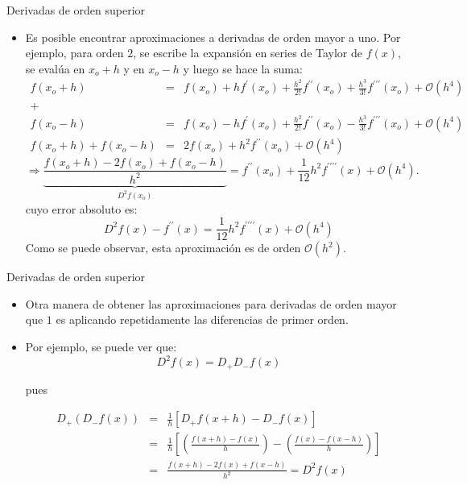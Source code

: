 \documentclass{beamer}
\begin{document}
\begin{frame}{Derivadas de orden superior}
	
	\begin{itemize}
		\item {\small Es posible encontrar aproximaciones a derivadas de orden mayor a uno. 
		Por ejemplo, para orden $2$, se escribe la expansión en series de Taylor de $f(x)$,
		se evalúa en $x_o + h$ y en $x_o - h$ y luego se hace la suma:}
%	
{\footnotesize 
	\begin{eqnarray*}
		f(x_o+h) & = & f(x_o) + h f^\prime(x_o) + \frac{h^2}{2!}f^{\prime\prime}(x_o)
		+ \frac{h^3}{3!}f^{\prime\prime\prime}(x_o) + \mathcal{O}(h^4) \\ +\quad \qquad \qquad & &\\
		f(x_o-h) & = & f(x_o) - h f^\prime(x_o) + \frac{h^2}{2!}f^{\prime\prime}(x_o)
		- \frac{h^3}{3!}f^{\prime\prime\prime}(x_o) + \mathcal{O}(h^4) \\
		\hline
		f(x_o+h) + f(x_o-h) & = & 2 f(x_o) + h^2 f^{\prime\prime}(x_o) + \mathcal{O}(h^4)
	\end{eqnarray*}
	\[
	\Longrightarrow \underbrace{\frac{f(x_o+h) - 2 f(x_o) + f(x_o-h)}{h^2}}_{D^2 f(x_o)} = f^{\prime\prime}(x_o) + \frac{1}{12} h^2 f^{\prime\prime\prime\prime}(x) + \mathcal{O}(h^4). 
	\]
%		
	cuyo error absoluto es:
		\[ 
		D^2 f(x) - f^{\prime\prime}(x) = \frac{1}{12} h^2 f^{\prime\prime\prime\prime}(x) + \mathcal{O}(h^4)
		\]
}		
{\small Como se puede observar, esta aproximación es de orden $\mathcal{O}(h^2)$.}
		
	\end{itemize}
\end{frame}

\begin{frame}{Derivadas de orden superior}
	
	\begin{itemize}
		\item Otra manera de obtener las aproximaciones para derivadas de orden mayor que $1$ es aplicando 
		repetidamente las diferencias de primer orden.
		\item Por ejemplo, se puede ver que:
		\[
		D^2 f(x) = D_+ D_- f(x)
		\]
		
		pues 
		
		\begin{eqnarray*}
			D_+(D_-f(x)) & = & \frac{1}{h} \left[D_+ f(x+h) - D_-f(x) \right] \\
			& = & \frac{1}{h} \left[\left(\frac{f(x+h) - f(x)}{h} \right) - \left(\frac{f(x) - f(x-h)}{h} \right)\right] \\
			& = &\frac{f(x+h) - 2f(x) + f(x-h)}{h^2} = D^2 f(x)
		\end{eqnarray*}
		
	\end{itemize}
\end{frame}
\end{document}
